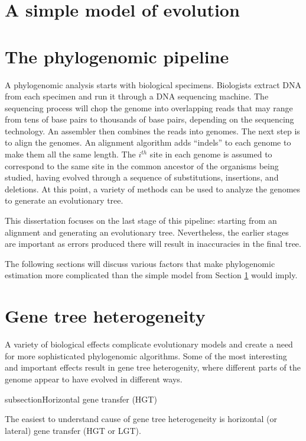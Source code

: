 \documentclass[edeposit,fullpage]{uiucthesis2014}
\theoremstyle{definition}
\begin{document}
\section{A simple model of evolution}
\label{section:simple-model}



\section{The phylogenomic pipeline}
A phylogenomic analysis starts with biological specimens. Biologists extract DNA from each specimen and run it through a DNA sequencing machine. The sequencing process will chop the genome into overlapping reads that may range from tens of base pairs to thousands of base pairs, depending on the sequencing technology. An assembler then combines the reads into genomes. The next step is to align the genomes. An alignment algorithm adds ``indels'' to each genome to make them all the same length. The $i^{th}$ site in each genome is assumed to correspond to the same site in the common ancestor of the organisms being studied, having evolved through a sequence of substitutions, insertions, and deletions. At this point, a variety of methods can be used to analyze the genomes to generate an evolutionary tree.

This dissertation focuses on the last stage of this pipeline: starting from an alignment and generating an evolutionary tree. Nevertheless, the earlier stages are important as errors produced there will result in inaccuracies in the final tree.

The following sections will discuss various factors that make phylogenomic estimation more complicated than the simple model from Section \ref{section:simple-model} would imply. 

\section{Gene tree heterogeneity}
\label{sec:heterogeneity}
A variety of biological effects complicate evolutionary models and create a need for more sophisticated phylogenomic algorithms. Some of the most interesting and important effects result in gene tree heterogenity, where different parts of the genome appear to have evolved in different ways. 

subsection{Horizontal gene transfer (HGT)}

The easiest to understand cause of gene tree heterogeneity is horizontal (or lateral) gene transfer (HGT or LGT). 
\end{document}
